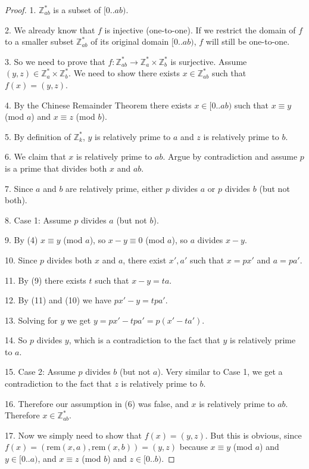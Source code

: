 \documentclass[14pt]{extarticle}
\begin{document}
\begin{proof}
1. $\mathbb{Z}_{ab}^*$ is a subset of $[0..ab)$.

2. We already know that $f$ is injective (one-to-one). If we restrict the domain of $f$ to a smaller subset $\mathbb{Z}_{ab}^*$ of its original domain $[0..ab)$, $f$ will still be one-to-one.

3. So we need to prove that $f: \mathbb{Z}_{ab}^* \to \mathbb{Z}_a^* \times \mathbb{Z}_b^*$ is surjective. Assume $(y, z) \in \mathbb{Z}_a^* \times \mathbb{Z}_b^*$. We need to show there exists $x \in \mathbb{Z}_{ab}^*$ such that $f(x) = (y, z)$.

4. By the Chinese Remainder Theorem there exists $x \in [0..ab)$ such that $x \equiv y$ (mod $a$) and $x \equiv z$ (mod $b$).

5. By definition of $\mathbb{Z}_k^*$, $y$ is relatively prime to $a$ and $z$ is relatively prime to $b$.

6. We claim that $x$ is relatively prime to $ab$. Argue by contradiction and assume $p$ is a prime that divides both $x$ and $ab$.

7. Since $a$ and $b$ are relatively prime, either $p$ divides $a$ or $p$ divides $b$ (but not both).

8. Case 1: Assume $p$ divides $a$ (but not $b$). 

9. By (4) $x \equiv y$ (mod $a$), so $x - y \equiv 0$ (mod $a$), so $a$ divides $x - y$.

10. Since $p$ divides both $x$ and $a$, there exist $x', a'$ such that $x = px'$ and $a = pa'$.

11. By (9) there exists $t$ such that $x - y = ta$.

12. By (11) and (10) we have $px' - y = tpa'$.

13. Solving for $y$ we get $y = px' - tpa' = p(x' - ta')$. 

14. So $p$ divides $y$, which is a contradiction to the fact that $y$ is relatively prime to $a$.

15. Case 2: Assume $p$ divides $b$ (but not $a$). Very similar to Case 1, we get a contradiction to the fact that $z$ is relatively prime to $b$.

16. Therefore our assumption in (6) was false, and $x$ is relatively prime to $ab$. Therefore $x \in \mathbb{Z}_{ab}^*$.

17. Now we simply need to show that $f(x) = (y, z)$. But this is obvious, since $f(x) = (\text{rem}(x, a), \text{rem}(x, b)) = (y,z)$ because $x \equiv y$ (mod $a$) and $y \in [0..a)$, and $x \equiv z$ (mod $b$) and $z \in [0..b)$.
\end{proof}
\end{document}
